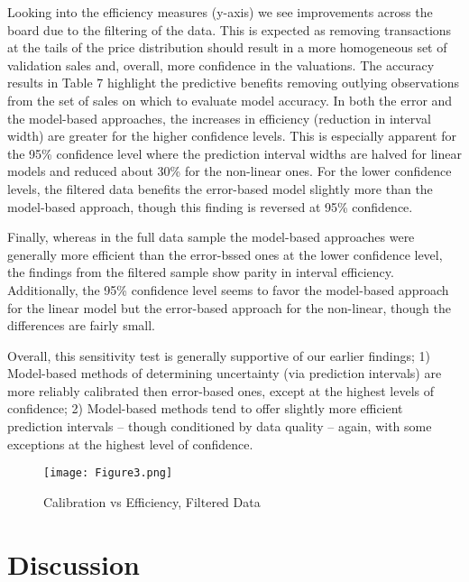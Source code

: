 \documentclass[colTwo]{anon}
\theoremstyle{definition}
\begin{document}
Looking into the efficiency measures (y-axis) we see improvements across the board due to the filtering of the data.  This is expected as removing transactions at the tails of the price distribution should result in a more homogeneous set of validation sales and, overall, more confidence in the valuations.  The accuracy results in Table 7 highlight the predictive benefits removing outlying observations from the set of sales on which to evaluate model accuracy. In both the error and the model-based approaches, the increases in efficiency (reduction in interval width) are greater for the higher confidence levels.  This is especially apparent for the 95\% confidence level where the prediction interval widths are halved for linear models and reduced about 30\% for the non-linear ones.  For the lower confidence levels, the filtered data benefits the error-based model slightly more than the model-based approach, though this finding is reversed at 95\% confidence.

Finally, whereas in the full data sample the model-based approaches were generally more efficient than the error-bssed ones at the lower confidence level, the findings from the filtered sample show parity in interval efficiency.  Additionally, the 95\% confidence level seems to favor the model-based approach for the linear model but the error-based approach for the non-linear, though the differences are fairly small.

Overall, this sensitivity test is generally supportive of our earlier findings; 1) Model-based methods of determining uncertainty (via prediction intervals) are more reliably calibrated then error-based ones, except at the highest levels of confidence; 2) Model-based methods tend to offer slightly more efficient prediction intervals -- though conditioned by data quality -- again, with some exceptions at the highest level of confidence.

\begin{figure*}[h!]
\centering
\texttt{[image: Figure3.png]}
\caption{Calibration vs Efficiency, Filtered Data}
\label{fig:calibsens}
\end{figure*}

\section{Discussion}
\end{document}
